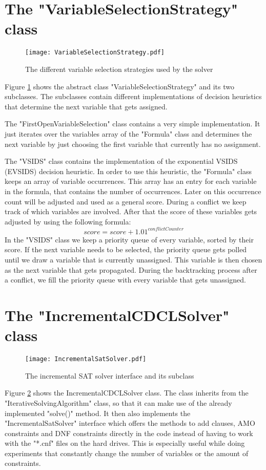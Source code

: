 \section{The "VariableSelectionStrategy" class}

\begin{figure}[htbp]
  \centering
  \texttt{[image: VariableSelectionStrategy.pdf]}
  \caption{The different variable selection strategies used by the solver}
  \label{fig:variableSelection}
\end{figure}

Figure \ref{fig:variableSelection} shows the abstract class "VariableSelectionStrategy" and its two subclasses. The subclasses contain different implementations of decision heuristics that determine the next variable that gets assigned.

The "FirstOpenVariableSelection" class contains a very simple implementation. It just iterates over the variables array of the "Formula" class and determines the next variable by just choosing the first variable that currently has no assignment.

The "VSIDS" class contains the implementation of the exponential VSIDS (EVSIDS) decision heuristic. In order to use this heuristic, the "Formula" class keeps an array of variable occurrences. This array has an entry for each variable in the formula, that contains the number of occurrences. Later on this occurrence count will be adjusted and used as a general score. During a conflict we keep track of which variables are involved. After that the score of these variables gets adjusted by using the following formula:
\begin{displaymath}
score = score + {1.01}^{conflictCounter}
\end{displaymath}
In the "VSIDS" class we keep a priority queue of every variable, sorted by their score. If the next variable needs to be selected, the priority queue gets polled until we draw a variable that is currently unassigned. This variable is then chosen as the next variable that gets propagated. During the backtracking process after a conflict, we fill the priority queue with every variable that gets unassigned.

\section{The "IncrementalCDCLSolver" class}

\begin{figure}[htbp]
  \centering
  \texttt{[image: IncrementalSatSolver.pdf]}
  \caption{The incremental SAT solver interface and its subclass}
  \label{fig:incrementalSAT}
\end{figure}

Figure \ref{fig:incrementalSAT} shows the IncrementalCDCLSolver class. The class inherits from the "IterativeSolvingAlgorithm" class, so that it can make use of the already implemented "solve()" method. It then also implements the "IncrementalSatSolver" interface which offers the methods to add clauses, AMO constraints and DNF constraints directly in the code instead of having to work with the "*.cnf" files on the hard drives. This is especially useful while doing experiments that constantly change the number of variables or the amount of constraints.
